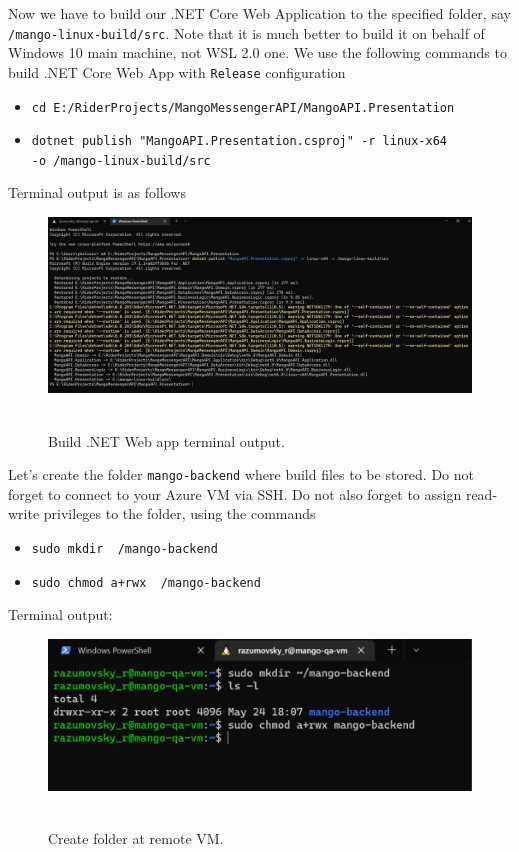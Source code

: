 Now we have to build our .NET Core Web Application to the specified folder, say \texttt{/mango-linux-build/src}.
Note that it is much better to build it on behalf of Windows 10 main machine, not WSL 2.0 one.
We use the following commands to build .NET Core Web App with \texttt{Release} configuration
\begin{itemize}
    \item \texttt{cd E:/RiderProjects/MangoMessengerAPI/MangoAPI.Presentation}
    \item \texttt{dotnet publish "MangoAPI.Presentation.csproj" -r linux-x64 \\ -o /mango-linux-build/src}
\end{itemize}
Terminal output is as follows
\begin{figure}[H]
    \centering
    \includegraphics[width=1\textwidth]{img/04_build_application}
    ~\caption{Build .NET Web app terminal output.}\label{fig:figure9}
\end{figure}
Let's create the folder \texttt{mango-backend} where build files to be stored.
Do not forget to connect to your Azure VM via SSH\@.
Do not also forget to assign read-write privileges to the folder, using the commands
\begin{itemize}
    \item \texttt{sudo mkdir ~/mango-backend}
    \item \texttt{sudo chmod a+rwx ~/mango-backend}
\end{itemize}
Terminal output:
\begin{figure}[H]
    \centering
    \includegraphics[width=1\textwidth]{img/04_create_remote_folder}
    ~\caption{Create folder at remote VM.}\label{fig:figure10}
\end{figure}
